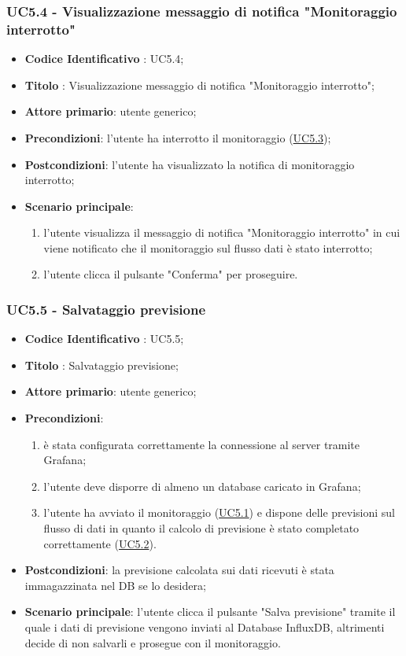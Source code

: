 	\label{par:UC5.4}
	\subsubsection{UC5.4 - Visualizzazione messaggio di notifica "Monitoraggio interrotto"}
		\begin{itemize}
			\item\textbf{Codice Identificativo} : UC5.4;
			\item\textbf{Titolo} : Visualizzazione messaggio di notifica "Monitoraggio interrotto";
			\item\textbf{Attore primario}: utente generico;
			\item\textbf{Precondizioni}: l'utente ha interrotto il monitoraggio (\hyperref[par:UC5.3]{UC5.3});
			\item\textbf{Postcondizioni}: l'utente ha visualizzato la notifica di monitoraggio interrotto;
			\item\textbf{Scenario principale}:
				\begin{enumerate}
					\item l'utente visualizza il messaggio di notifica "Monitoraggio interrotto" in cui viene notificato che il monitoraggio sul flusso dati è stato interrotto;
					\item l'utente clicca il pulsante "Conferma" per proseguire.		
				\end{enumerate}		
		\end{itemize}
		
	\label{par:UC5.5}
	\subsubsection{UC5.5 - Salvataggio previsione}
		\begin{itemize}
			\item\textbf{Codice Identificativo} : UC5.5;
			\item\textbf{Titolo} : Salvataggio previsione;
			\item\textbf{Attore primario}: utente generico;
			\item\textbf{Precondizioni}:
				\begin{enumerate}
					\item è stata configurata correttamente la connessione al server tramite Grafana;
					\item l'utente deve disporre di almeno un database caricato in Grafana;
					\item l'utente ha avviato il monitoraggio (\hyperref[par:UC5.1]{UC5.1}) e dispone delle previsioni sul flusso di dati in quanto il calcolo di previsione è stato completato correttamente (\hyperref[par:UC5.2]{UC5.2}).
				\end{enumerate}
			\item\textbf{Postcondizioni}: la previsione calcolata sui dati ricevuti è stata immagazzinata nel DB se lo desidera;
			\item\textbf{Scenario principale}: l'utente clicca il pulsante "Salva previsione" tramite il quale i dati di previsione vengono inviati al Database InfluxDB, altrimenti decide di non salvarli e prosegue con il monitoraggio.
			
		\end{itemize}	
		
